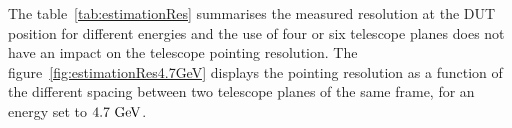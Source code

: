    The table~\ref{tab:estimationRes} summarises the measured resolution at the \gls{DUT} position for different energies and the use of four or six telescope planes does not have an impact on the telescope pointing resolution.
    The figure~\ref{fig:estimationRes4.7GeV} displays the pointing resolution as a function of the different spacing between two telescope planes of the same frame, for an energy set to $4.7~\rm{GeV}$.



